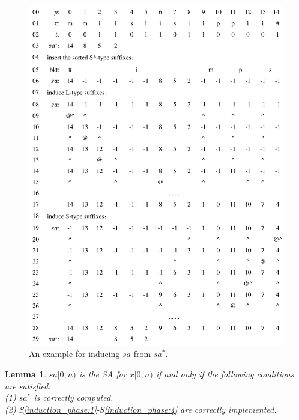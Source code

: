\documentclass[10pt,journal,compsoc]{IEEEtran}
\newtheorem{lemma}[theorem]{Lemma}
\begin{document}
\begin{figure}[t]
	\centering
	
	\includegraphics[width = 1\columnwidth]{example.pdf}
	
	\caption{An example for inducing $sa$ from $sa^*$.}
	
	\label{fig:example1}
	
\end{figure}


\begin{lemma} \label{lemma:2}
    $sa[0, n)$ is the SA for $x[0, n)$ if and only if the following conditions are satisfied: \\
    (1) $sa^*$ is correctly computed. \\
    (2) S\ref{induction_phase:1}-S\ref{induction_phase:4} are correctly implemented. \\
\end{lemma}
\end{document}
